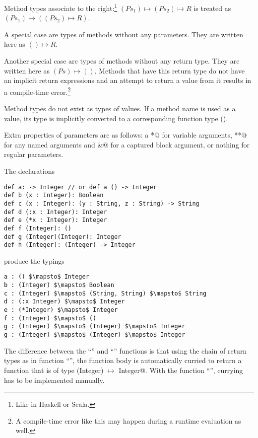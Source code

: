Method types associate to the right:\footnote{Like in Haskell or Scala.} \newline
$(Ps_1) \mapsto (Ps_2) \mapsto R$ is treated as $(Ps_1) \mapsto ((Ps_2) \mapsto R)$. 

A special case are types of methods without any parameters. They are written here as $() \mapsto R$. 

Another special case are types of methods without any return type. They are written here as $(Ps) \mapsto ()$. Methods that have this return type do not have an implicit return expressions and an attempt to return a value from it results in a compile-time error.\footnote{A compile-time error like this may happen during a runtime evaluation as well.}

Method types do not exist as types of values. If a method name is used as a value, its type is implicitly converted to a corresponding function type (). 

Extra properties of parameters are as follows: a \lstinline@*@ for variable arguments, \lstinline@**@ for any named arguments and \lstinline@&@ for a captured block argument, or nothing for regular parameters. 

\example The declarations
\begin{lstlisting}
def a: -> Integer // or def a () -> Integer
def b (x : Integer): Boolean
def c (x : Integer): (y : String, z : String) -> String
def d (:x : Integer): Integer
def e (*x : Integer): Integer
def f (Integer): ()
def g (Integer)(Integer): Integer
def h (Integer): (Integer) -> Integer
\end{lstlisting}
produce the typings
\begin{lstlisting}
a : () $\mapsto$ Integer
b : (Integer) $\mapsto$ Boolean
c : (Integer) $\mapsto$ (String, String) $\mapsto$ String
d : (:x Integer) $\mapsto$ Integer
e : (*Integer) $\mapsto$ Integer
f : (Integer) $\mapsto$ ()
g : (Integer) $\mapsto$ (Integer) $\mapsto$ Integer
g : (Integer) $\mapsto$ (Integer) $\mapsto$ Integer
\end{lstlisting}

The difference between the ``'' and ``'' functions is that using the chain of return types as in function ``'', the function body is automatically curried to return a function that is of type \lstinline@(Integer) $\mapsto$ Integer@. With the function ``'', currying has to be implemented manually. 






